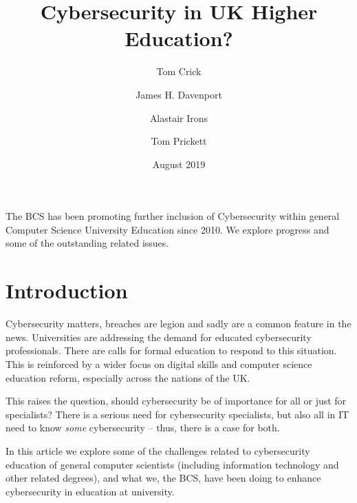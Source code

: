 \documentclass[a4paper,11pt]{article}
\title{Cybersecurity in UK Higher Education?}
\author[1]{Tom Crick}
\author[2]{James H. Davenport}
\author[3]{Alastair Irons}
\author[4]{Tom Prickett}
\affil[1]{Swansea University, Swansea, UK}
\affil[2]{University of Bath, Bath, UK}
\affil[3]{Sunderland University, Sunderland, UK}
\affil[4]{Northumbria University, Newcastle upon Tyne, UK}
\affil[1]{\url{thomas.crick@swansea.ac.uk}}
\affil[2]{\url{j.h.davenport@bath.ac.uk}}
\affil[3]{\url{alastair.irons@sunderland.ac.uk}}
\affil[4]{\url{tom.prickett@northumbria.ac.uk}}
\date{August 2019}
\begin{document}
\maketitle


\begin{strapline}
The BCS has been promoting further inclusion of Cybersecurity within general Computer Science University Education since 2010. We explore progress and some of the outstanding related issues.

\end{strapline}




\section*{Introduction}

Cybersecurity matters, breaches are legion and sadly are a common feature in the news. Universities are  addressing the demand for educated cybersecurity professionals.  There are calls for formal education to respond to this situation. This is reinforced by a wider focus on digital skills and computer science education reform, especially across the nations of the UK. 

This raises the question, should cybersecurity be of importance for all or just for specialists? There is a serious need for cybersecurity specialists, but also all in IT need to know \emph{some} cybersecurity -- thus, there is a case for both. 

In this article we explore some of the challenges related to cybersecurity education of general computer scientists (including information technology and other related degrees), and what we, the BCS, have been doing to enhance cybersecurity in education at university.


\end{document}
